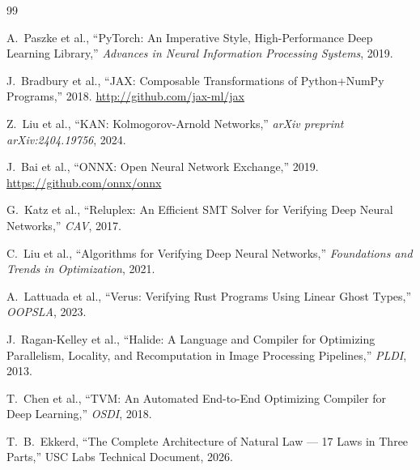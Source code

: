 \documentclass[11pt,a4paper]{article}
\begin{document}
\begin{thebibliography}{99}

A.\ Paszke et al.,
``PyTorch: An Imperative Style, High-Performance Deep Learning Library,''
\emph{Advances in Neural Information Processing Systems}, 2019.

J.\ Bradbury et al.,
``JAX: Composable Transformations of Python+NumPy Programs,''
2018. \url{http://github.com/jax-ml/jax}

Z.\ Liu et al.,
``KAN: Kolmogorov-Arnold Networks,''
\emph{arXiv preprint arXiv:2404.19756}, 2024.

J.\ Bai et al.,
``ONNX: Open Neural Network Exchange,''
2019. \url{https://github.com/onnx/onnx}

G.\ Katz et al.,
``Reluplex: An Efficient SMT Solver for Verifying Deep Neural Networks,''
\emph{CAV}, 2017.

C.\ Liu et al.,
``Algorithms for Verifying Deep Neural Networks,''
\emph{Foundations and Trends in Optimization}, 2021.

A.\ Lattuada et al.,
``Verus: Verifying Rust Programs Using Linear Ghost Types,''
\emph{OOPSLA}, 2023.

J.\ Ragan-Kelley et al.,
``Halide: A Language and Compiler for Optimizing Parallelism, Locality, and Recomputation in Image Processing Pipelines,''
\emph{PLDI}, 2013.

T.\ Chen et al.,
``TVM: An Automated End-to-End Optimizing Compiler for Deep Learning,''
\emph{OSDI}, 2018.

T.\ B.\ Ekkerd,
``The Complete Architecture of Natural Law --- 17 Laws in Three Parts,''
USC Labs Technical Document, 2026.

\end{thebibliography}
\end{document}
